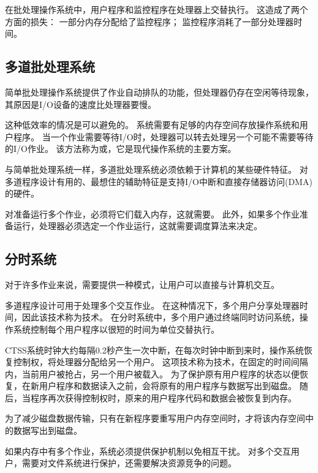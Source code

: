 {{        在批处理操作系统中，用户程序和监控程序在处理器上交替执行。
        这造成了两个方面的损失：
        一部分内存分配给了监控程序；
        监控程序消耗了一部分处理器时间。
    }

    \subsection{多道批处理系统}
    {
        简单批处理操作系统提供了作业自动排队的功能，但处理器仍存在空闲等待现象，其原因是I/O设备的速度比处理器要慢。

        这种低效率的情况是可以避免的。
        系统需要有足够的内存空间存放操作系统和用户程序。
        当一个作业需要等待I/O时，处理器可以转去处理另一个可能不需要等待的I/O作业。
        该方法称为或，它是现代操作系统的主要方案。

        与简单批处理系统一样，多道批处理系统必须依赖于计算机的某些硬件特征。
        对多道程序设计有用的、最想住的辅助特征是支持I/O中断和直接存储器访问(DMA)的硬件。

        对准备运行多个作业，必须将它们载入内存，这就需要。
        此外，如果多个作业准备运行，处理器必须选定一个作业运行，这就需要调度算法来决定。
    }

    \subsection{分时系统}
    {
        对于许多作业来说，需要提供一种模式，让用户可以直接与计算机交互。

        多道程序设计可用于处理多个交互作业。
        在这种情况下，多个用户分享处理器时间，因此该技术称为技术。
        在分时系统中，多个用户通过终端同时访问系统，操作系统控制每个用户程序以很短的时间为单位交替执行。

        CTSS系统时钟大约每隔0.2秒产生一次中断，在每次时钟中断到来时，操作系统恢复控制权，将处理器分配给另一个用户。
        这项技术称为技术，在固定的时间间隔内，当前用户被抢占，另一个用户被载入。
        为了保护原有用户程序的状态以便恢复，在新用户程序和数据读入之前，会将原有的用户程序与数据写出到磁盘。
        随后，当程序再次获得控制权时，原来的用户程序代码和数据会被恢复到内存。

        为了减少磁盘数据传输，只有在新程序要重写用户内存空间时，才将该内存空间中的数据写出到磁盘。

        如果内存中有多个作业，系统必须提供保护机制以免相互干扰。
        对多个交互用户，需要对文件系统进行保护，还需要解决资源竞争的问题。
    }
}
